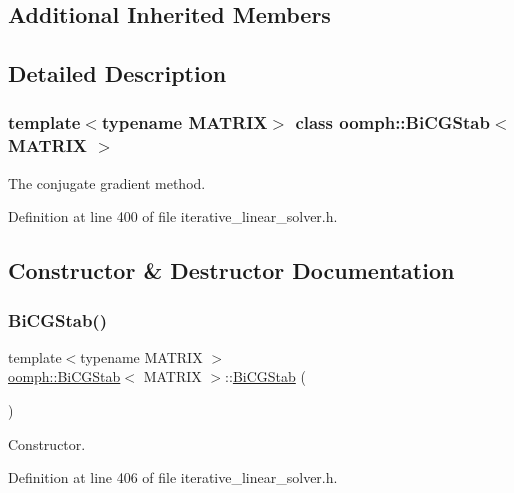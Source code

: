 \subsection*{Additional Inherited Members}


\subsection{Detailed Description}
\subsubsection*{template$<$typename M\+A\+T\+R\+IX$>$\newline
class oomph\+::\+Bi\+C\+G\+Stab$<$ M\+A\+T\+R\+I\+X $>$}

The conjugate gradient method. 

Definition at line 400 of file iterative\+\_\+linear\+\_\+solver.\+h.



\subsection{Constructor \& Destructor Documentation}
\mbox{\label{classoomph_1_1BiCGStab_ae2ed7dfe942fb9947a14ddb0274a0bb5}} 
\subsubsection{\texorpdfstring{Bi\+C\+G\+Stab()}{BiCGStab()}\hspace{0.1cm}{\footnotesize\ttfamily [1/2]}}
{\footnotesize\ttfamily template$<$typename M\+A\+T\+R\+IX $>$ \\
\hyperlink{classoomph_1_1BiCGStab}{oomph\+::\+Bi\+C\+G\+Stab}$<$ M\+A\+T\+R\+IX $>$\+::\hyperlink{classoomph_1_1BiCGStab}{Bi\+C\+G\+Stab} (\begin{DoxyParamCaption}{ }\end{DoxyParamCaption})\hspace{0.3cm}{\ttfamily [inline]}}



Constructor. 



Definition at line 406 of file iterative\+\_\+linear\+\_\+solver.\+h.

